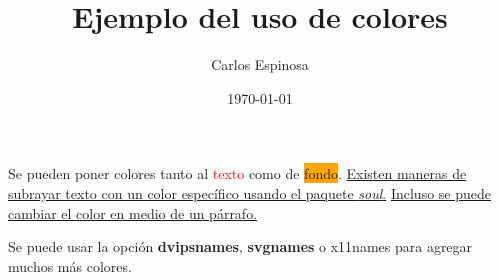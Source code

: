 \documentclass{article}
\title{Ejemplo del uso de colores}
\author{Carlos Espinosa}
\date{\today}
\begin{document}
   \maketitle

   Se pueden poner colores tanto al \textcolor{red}{texto} como de \colorbox{orange}{fondo}. \ul{Existen maneras de subrayar texto con un color específico usando el paquete \emph{soul}.}
   \ul{Incluso se puede cambiar el color en medio de un párrafo.}

   Se puede usar la opción \textbf{dvipsnames}, \textbf{svgnames} o {x11names} para agregar muchos más colores.
\end{document}
